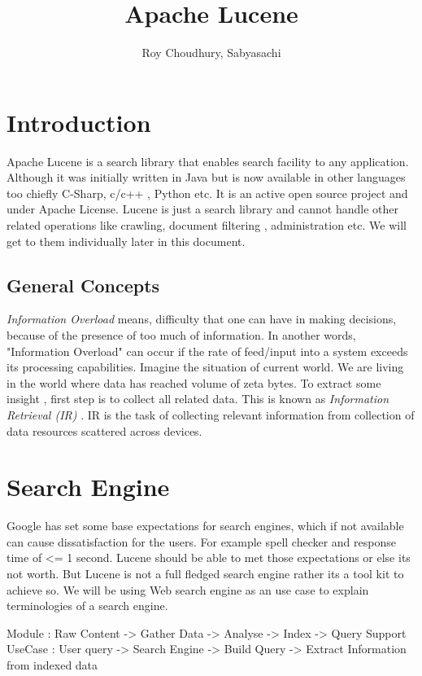 \documentclass[9pt,twocolumn,twoside]{../../styles/osajnl}
\title{Apache Lucene}
\author[1,*, +]{Roy Choudhury, Sabyasachi}
\affil[1]{School of Informatics and Computing, Bloomington, IN 47408, U.S.A.}
\affil[*]{Corresponding authors: sabyroyc@indiana.edu}
\affil[+]{HID - S17-IO-3015}
\begin{document}
\maketitle

\section{Introduction}

Apache Lucene is a search library that enables search facility to any 
application. Although it was initially written in Java but is now available
in other languages too chiefly C-Sharp, c/c++ , Python etc. It is an active
open source project and under Apache License. Lucene is just a search library 
and cannot handle other related operations like crawling, document filtering , 
administration etc. We will get to them individually later in this document.

\subsection{General Concepts}
\emph{Information Overload}  means, difficulty that one can have in making 
decisions, because of the presence of too much of information. In another 
words, "Information Overload" can occur if the rate of feed/input into a 
system exceeds its processing capabilities. Imagine the situation of current 
world. We are living in the world where data has reached volume of zeta bytes.
To extract some insight , first step is to collect all related data. This is 
known as \emph{Information Retrieval (IR)} \cite{wiki-ir}. IR is the task of 
collecting relevant information from collection of data resources scattered 
across devices. 

\section{Search Engine}
Google has set some base expectations for search engines, which if not 
available can cause dissatisfaction for the users. For example spell checker 
and response time of <= 1 second. Lucene should be able to met those 
expectations or else its not worth. But Lucene is not a full fledged search 
engine rather its a tool kit to achieve so. We will be using Web search engine
as an use case to explain terminologies of a search engine. 

Module  : Raw Content -> Gather Data -> Analyse -> Index ->  Query Support 
UseCase : User query -> Search Engine -> Build Query -> Extract Information 
from indexed data
\end{document}

